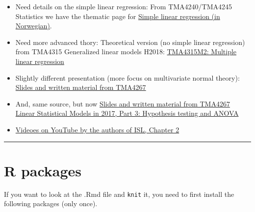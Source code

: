 \documentclass[]{article}
\providecommand{\tightlist}{%
  \setlength{\itemsep}{0pt}\setlength{\parskip}{0pt}}
\begin{document}
\begin{itemize}
\tightlist
\item
  Need details on the simple linear regression: From TMA4240/TMA4245
  Statistics we have the thematic page for
  \href{https://wiki.math.ntnu.no/tma4245/tema/begreper/regression}{Simple
  linear regression (in Norwegian)}.
\item
  Need more advanced thory: Theoretical version (no simple linear
  regression) from TMA4315 Generalized linear models H2018:
  \href{https://www.math.ntnu.no/emner/TMA4315/2018h/2MLR.html}{TMA4315M2:
  Multiple linear regression}
\item
  Slightly different presentation (more focus on multivariate normal
  theory):
  \href{https://www.math.ntnu.no/emner/TMA4267/2017v/TMA4267V2017Part2.pdf}{Slides
  and written material from TMA4267}
\item
  And, same source, but now
  \href{http://www.math.ntnu.no/emner/TMA4267/2017v/TMA4267V2017Part3.pdf}{Slides
  and written material from TMA4267 Linear Statistical Models in 2017,
  Part 3: Hypothesis testing and ANOVA}
\item
  \href{https://www.youtube.com/playlist?list=PL5-da3qGB5IBSSCPANhTgrw82ws7w_or9}{Videoes
  on YouTube by the authors of ISL, Chapter 2}
\end{itemize}

\begin{center}\rule{0.5\linewidth}{\linethickness}\end{center}

\hypertarget{r-packages}{%
\section{ R packages}\label{r-packages}}

If you want to look at the .Rmd file and \texttt{knit} it, you need to
first install the following packages (only once).
\end{document}
